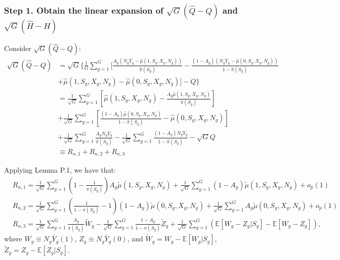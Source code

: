 \documentclass{article}
\begin{document}
\subsubsection*{Step 1. Obtain the linear expansion of $\sqrt{G}(\hat{Q} - Q)$ and $\sqrt{G}(\hat{H} - H)$}
Consider $\sqrt{G}(\hat{Q} - Q)$:
\begin{align}
\sqrt{G}(\hat{Q} - Q) &= \sqrt{G}\Bigg\{\frac{1}{G} \sum_{g = 1}^{G} \Bigg[ \frac{A_g (N_g\bar{Y}_g - \hat{\mu}(1, S_g, X_g, N_g))}{\hat{\pi}(S_g)} - \frac{(1 - A_g) (N_g\bar{Y}_g - \hat{\mu}(0,S_g,X_g,N_g))}{1 - \hat{\pi}(S_g)} \nonumber \\ 
&+ \hat{\mu}(1,S_g, X_g, N_g) - \hat{\mu}(0,S_g, X_g, N_g) \Bigg] - Q \Bigg\} \nonumber \\
&=\frac{1}{\sqrt{G}} \sum_{g=1}^{G} \left[\hat{\mu}(1, S_g, X_g, N_g) - \frac{A_g \hat{\mu}(1, S_g, X_g, N_g)}{\hat{\pi}(S_g)} \right] \nonumber \\
&+ \frac{1}{\sqrt{G}} \sum_{g=1}^{G} \left[ \frac{(1-A_g) \hat{\mu}(0,S_g,X_g,N_g)}{1 - \hat{\pi}(S_g)} - \hat{\mu}(0,S_g,X_g,N_g) \right] \nonumber \\
&+ \frac{1}{\sqrt{G}} \sum_{g=1}^{G} \frac{A_g N_g \bar{Y}_g}{\hat{\pi}(S_g)} - \frac{1}{\sqrt{G}} \sum_{g = 1}^{G} \frac{(1 - A_g) N_g \bar{Y}_g}{1 - \hat{\pi}(S_g)} - \sqrt{G}Q \nonumber\\
&\equiv R_{n,1} + R_{n,2} + R_{n,3} \nonumber 
\end{align}

Applying Lemma P.1, we have that: 
 \begin{align}
 	&R_{n,1} = \frac{1}{\sqrt{G}} \sum_{g=1}^{G} \left(1 - \frac{1}{\pi(S_g)}\right) A_g \tilde{\mu}(1, S_g, X_g, N_g) + \frac{1}{\sqrt{G}} \sum_{g=1}^{G} (1 - A_g) \tilde{\mu}(1, S_g, X_g, N_g) + o_p(1) \nonumber \\
 	&R_{n,2} = \frac{1}{\sqrt{G}} \sum_{g=1}^{G} \left(\frac{1}{1 - \pi(S_g)} - 1\right) (1-A_g) \tilde{\mu}(0, S_g, X_g, N_g) + \frac{1}{\sqrt{G}} \sum_{g=1}^{G} A_g \tilde{\mu}(0, S_g, X_g, N_g) + o_p(1) \nonumber \\
 	&R_{n,3} = \frac{1}{\sqrt{G}} \sum_{g=1}^{G} \frac{A_g}{\pi(S_g)} \tilde{W}_g - \frac{1}{\sqrt{G}} \sum_{g=1}^{G} \frac{1 - A_g}{1 - \pi(S_g)} \tilde{Z}_g + \frac{1}{\sqrt{G}} \sum_{g=1}^{G} (\mathbb E [W_g - Z_g|S_g] - \mathbb E [W_g - Z_g]), \nonumber
 \end{align}
 where $W_g \equiv N_g \bar{Y}_g(1)$, $Z_g \equiv N_g \bar{Y}_g(0)$, and $\tilde{W}_g = W_g - \mathbb E[W_g |S_g]$, $\tilde{Z}_g = Z_g - \mathbb E[Z_g |S_g]$.
 
\end{document}
